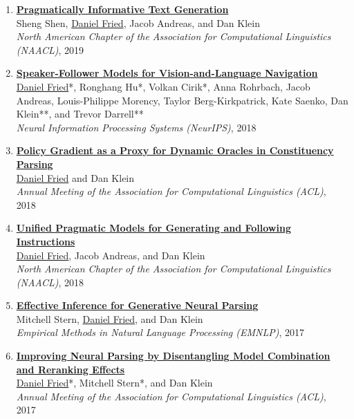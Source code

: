 \begin{enumerate}[leftmargin=-1mm,partopsep=0pt]
\item \href{https://arxiv.org/abs/1904.01301}{\textbf{Pragmatically Informative Text Generation}} \\
  Sheng Shen, \underline{Daniel Fried}, Jacob Andreas, and Dan Klein\\
  \emph{North American Chapter of the Association for Computational Linguistics (NAACL)}, 2019

\item \href{https://arxiv.org/abs/1806.02724}{\textbf{Speaker-Follower Models for Vision-and-Language Navigation}} \\
  \underline{Daniel Fried}*, Ronghang Hu*, Volkan Cirik*, Anna Rohrbach, Jacob Andreas, Louis-Philippe Morency, Taylor Berg-Kirkpatrick, Kate Saenko, Dan Klein**, and Trevor Darrell** \\
  \emph{Neural Information Processing Systems (NeurIPS)}, 2018

\item \href{https://arxiv.org/abs/1806.03290}{\textbf{Policy Gradient as a Proxy for Dynamic Oracles in Constituency Parsing}} \\
  \underline{Daniel Fried} and Dan Klein\\
  \emph{Annual Meeting of the Association for Computational Linguistics (ACL)}, 2018

\item \href{https://arxiv.org/abs/1711.04987}{\textbf{Unified Pragmatic Models for Generating and Following Instructions}} \\
  \underline{Daniel Fried}, Jacob Andreas, and Dan Klein\\
  \emph{North American Chapter of the Association for Computational Linguistics (NAACL)}, 2018

\item \href{http://arxiv.org/abs/1707.08976}{\textbf{Effective Inference for Generative Neural Parsing}} \\
  Mitchell Stern, \underline{Daniel Fried}, and Dan Klein\\
  \emph{Empirical Methods in Natural Language Processing (EMNLP)}, 2017

\item \href{https://arxiv.org/abs/1707.03058}{\textbf{Improving Neural Parsing by Disentangling Model Combination and Reranking Effects}} \\
  \underline{Daniel Fried}*, Mitchell Stern*, and Dan Klein\\
  \emph{Annual Meeting of the Association for Computational Linguistics (ACL)}, 2017


\end{enumerate}
